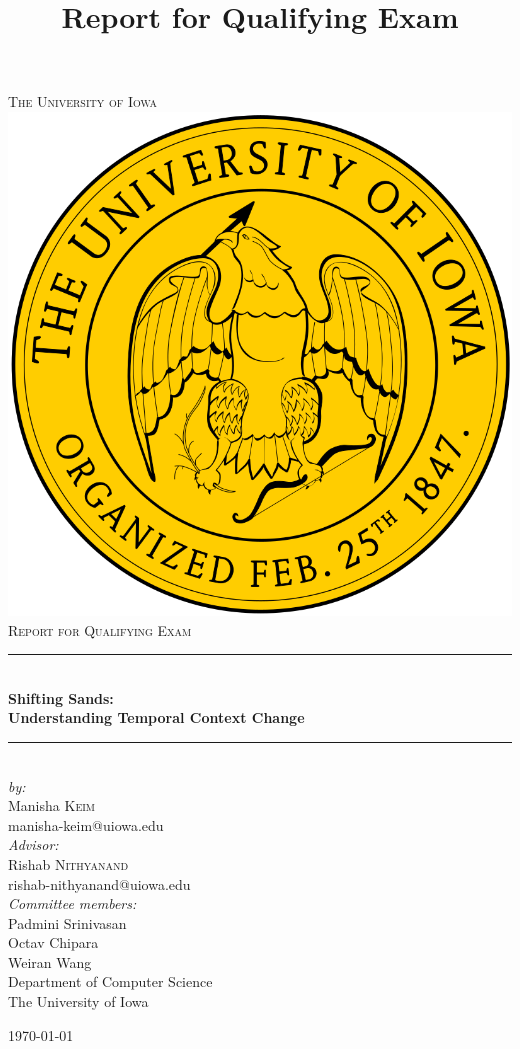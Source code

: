 
\begin{titlepage}

\newcommand{\HRule}{\rule{\linewidth}{0.5mm}}
\center

\textsc{\LARGE The University of Iowa}\\[1.5cm]
\includegraphics[scale=.1]{figures/iowa}\\[1cm]
\textsc{\Large Report for Qualifying Exam}\\[0.5cm]
\title {Report for Qualifying Exam}
\HRule \\[0.4cm]
{ \huge \bfseries Shifting Sands: \\Understanding Temporal Context Change}\\[0.4cm]
\HRule \\[1.5cm]

\emph{by:} \\
Manisha \textsc{Keim} \\
manisha-keim@uiowa.edu \\[0.5cm]

\emph{Advisor:}\\
Rishab \textsc{Nithyanand}\\
rishab-nithyanand@uiowa.edu \\[0.5cm]

\emph{Committee members:} \\
Padmini Srinivasan \\
Octav Chipara \\
Weiran Wang \\[0.5cm]

Department of Computer Science \\
The University of Iowa

{\today}\\[2cm]

\end{titlepage}